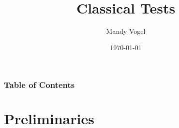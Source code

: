 \documentclass[xcolor={table}]{beamer}
\begin{document}
\title{Classical Tests}   
\author{Mandy Vogel} 
\date{\today}

\begin{frame}
\titlepage
\end{frame}

\begin{frame}
\frametitle{Table of Contents}\tableofcontents
\end{frame}

\section{Preliminaries}
\end{document}
